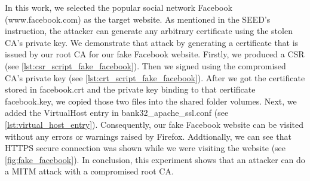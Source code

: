 In this work, we selected the popular
social network Facebook ({\selectfont www.facebook.com}) as the
target website. 
As mentioned in the SEED's instruction, the attacker can generate any arbitrary
certificate using the stolen CA's private key. We demonstrate that attack by generating
a certificate that is issued by our root CA for our fake Facebook website. Firstly,
we produced a CSR (see \autoref{lst:csr_script_fake_facebook}). Then we signed using
the compromised CA's private key (see \autoref{lst:crt_script_fake_facebook}). After
we got the certificate stored in {\selectfont facebook.crt} and the
private key binding to that certificate {\selectfont facebook.key},
we copied those two files into the shared folder {\selectfont volumes}.
Next, we added the {\selectfont VirtualHost} entry in {\selectfont
bank32\_apache\_ssl.conf} (see \autoref{lst:virtual_host_entry}). Consequently, our
fake Facebook website can be visited without any errors or warnings raised by Firefox.
Addtionally, we can see that HTTPS secure connection was shown while we were visiting
the website (see \autoref{fig:fake_facebook}). In conclusion, this experiment shows that
an attacker can do a MITM attack with a compromised root CA.
